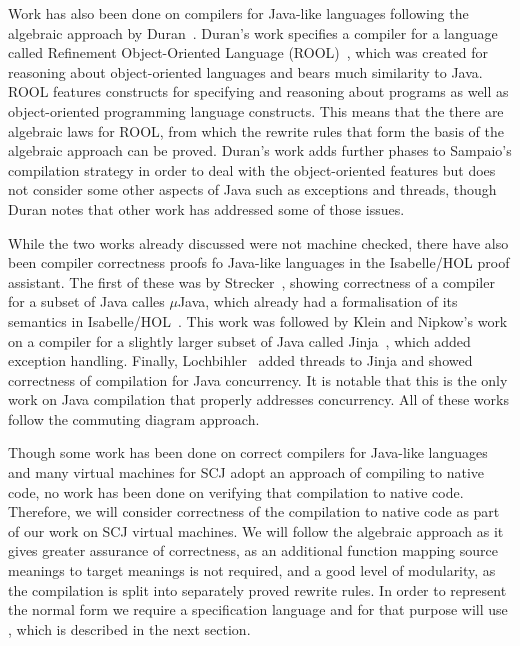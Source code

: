 \documentclass[a4paper,10pt]{report}
\begin{document}
Work has also been done on compilers for Java-like languages following the
algebraic approach by Duran~\cite{duran2005, duran2010}.  Duran's work specifies
a compiler for a language called Refinement Object-Oriented Language
(ROOL)~\cite{borba2000}, which was created for reasoning about object-oriented
languages and bears much similarity to Java.  ROOL features constructs for
specifying and reasoning about programs as well as object-oriented programming
language constructs.  This means that the there are algebraic laws for ROOL,
from which the rewrite rules that form the basis of the algebraic approach can
be proved.  Duran's work adds further phases to Sampaio's compilation strategy
in order to deal with the object-oriented features but does not consider some
other aspects of Java such as exceptions and threads, though Duran notes that
other work has addressed some of those issues.

While the two works already discussed were not machine checked, there have also
been compiler correctness proofs fo Java-like languages in the Isabelle/HOL
proof assistant.  The first of these was by Strecker~\cite{strecker2002},
showing correctness of a compiler for a subset of Java calles $\mu$Java, which
already had a formalisation of its semantics in Isabelle/HOL~\cite{nipkow2000}.
This work was followed by Klein and Nipkow's work on a compiler for a slightly
larger subset of Java called Jinja~\cite{klein2006}, which added exception
handling.  Finally, Lochbihler~\cite{lochbihler2010} added threads to Jinja and
showed correctness of compilation for Java concurrency.  It is notable that this
is the only work on Java compilation that properly addresses concurrency.  All
of these works follow the commuting diagram approach.

Though some work has been done on correct compilers for Java-like languages and
many virtual machines for SCJ adopt an approach of compiling to native code, no
work has been done on verifying that compilation to native code.  Therefore, we
will consider correctness of the compilation to native code as part of our work
on SCJ virtual machines.  We will follow the algebraic approach as it gives
greater assurance of correctness, as an additional function mapping source
meanings to target meanings is not required, and a good level of modularity, as
the compilation is split into separately proved rewrite rules.  In order to
represent the normal form we require a specification language and for that
purpose will use \Circus{}, which is described in the next section.
\end{document}
